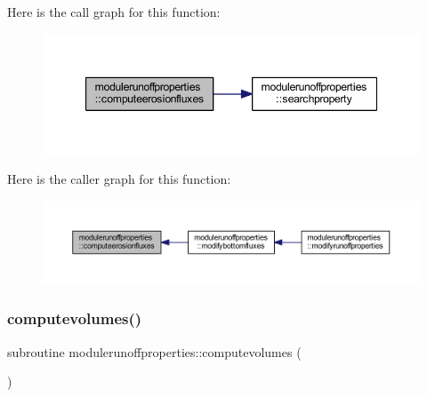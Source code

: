 Here is the call graph for this function\+:\nopagebreak
\begin{figure}[H]
\begin{center}
\leavevmode
\includegraphics[width=347pt]{namespacemodulerunoffproperties_aa72049d47379b80cbd6f207ff9ac534b_cgraph}
\end{center}
\end{figure}
Here is the caller graph for this function\+:\nopagebreak
\begin{figure}[H]
\begin{center}
\leavevmode
\includegraphics[width=350pt]{namespacemodulerunoffproperties_aa72049d47379b80cbd6f207ff9ac534b_icgraph}
\end{center}
\end{figure}
\mbox{\label{namespacemodulerunoffproperties_aebcfa403a8c7338421febfe72507ff1e}} 
\subsubsection{\texorpdfstring{computevolumes()}{computevolumes()}}
{\footnotesize\ttfamily subroutine modulerunoffproperties\+::computevolumes (\begin{DoxyParamCaption}{ }\end{DoxyParamCaption})\hspace{0.3cm}{\ttfamily [private]}}

